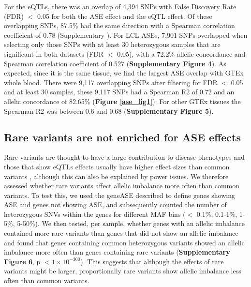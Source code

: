 {{For the eQTLs, there was an overlap of 4,394 SNPs with False Discovery Rate (FDR) $<$ 0.05 for both the ASE effect and the eQTL effect. Of these overlapping SNPs, 87.5\% had the same direction with a Spearman correlation coefficient of 0.78 (Supplementary ). For LCL ASEs, 7,901 SNPs overlapped when selecting only those SNPs with at least 30 heterozygous samples that are significant in both datasets (FDR $<$ 0.05), with a 72.2\% allelic concordance and Spearman correlation coefficient of 0.527 (\textbf{Supplementary Figure 4}). As expected, since it is the same tissue, we find the largest ASE overlap with GTEx whole blood. There were 9,117 overlapping SNPs after filtering for FDR $<$ 0.05 and at least 30 samples, these 9,117 SNPs had a Spearman R2 of 0.72 and an allelic concordance of 82.65\% (\textbf{Figure \ref{ase_fig1}}). For other GTEx tissues the Spearman R2 was between 0.6 and 0.68 (\textbf{Supplementary Figure 5}).

\subsection{Rare variants are not enriched for ASE effects}
Rare variants are thought to have a large contribution to disease phenotypes and those that show eQTLs effects usually have higher effect sizes than common variants \cite{claringbouldGeneticArchitectureMolecular2017a}, although this can also be explained by power issues. We therefore assessed whether rare variants affect allelic imbalance more often than common variants. To test this, we used the geneASE described to define genes showing ASE and genes not showing ASE, and subsequently counted the number of heterozygous SNVs within the genes for different MAF bins ($<$ 0.1\%, 0.1-1\%, 1-5\%, 5-50\%). We then tested, per sample, whether genes with an allelic imbalance contained more rare variants than genes that did not show an allelic imbalance and found that genes containing common heterozygous variants showed an allelic imbalance more often than genes containing rare variants (\textbf{Supplementary Figure 6}, p $< 1 \times 10^{-300}$). This suggests that although the effects of rare variants might be larger, proportionally rare variants show allelic imbalance less often than common variants. 

}}
